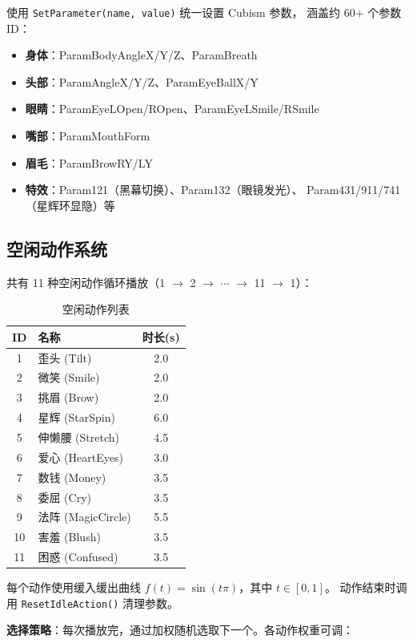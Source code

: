 \documentclass[12pt,a4paper]{ctexart}
\begin{document}
使用 \texttt{SetParameter(name, value)} 统一设置 Cubism 参数，
涵盖约 60+ 个参数 ID：
\begin{itemize}
    \item \textbf{身体}：ParamBodyAngleX/Y/Z、ParamBreath
    \item \textbf{头部}：ParamAngleX/Y/Z、ParamEyeBallX/Y
    \item \textbf{眼睛}：ParamEyeLOpen/ROpen、ParamEyeLSmile/RSmile
    \item \textbf{嘴部}：ParamMouthForm
    \item \textbf{眉毛}：ParamBrowRY/LY
    \item \textbf{特效}：Param121（黑幕切换）、Param132（眼镜发光）、
        Param431/911/741（星辉环显隐）等
\end{itemize}

\subsection{空闲动作系统}

共有 11 种空闲动作循环播放（1 $\to$ 2 $\to$ $\cdots$ $\to$ 11 $\to$ 1）：

\begin{table}[H]
\centering
\caption{空闲动作列表}
\label{tab:idle}
\begin{tabular}{clc}
\toprule
\textbf{ID} & \textbf{名称} & \textbf{时长(s)} \\
\midrule
1 & 歪头 (Tilt)    & 2.0 \\
2 & 微笑 (Smile)   & 2.0 \\
3 & 挑眉 (Brow)    & 2.0 \\
4 & 星辉 (StarSpin) & 6.0 \\
5 & 伸懒腰 (Stretch) & 4.5 \\
6 & 爱心 (HeartEyes) & 3.0 \\
7 & 数钱 (Money)   & 3.5 \\
8 & 委屈 (Cry)     & 3.5 \\
9 & 法阵 (MagicCircle) & 5.5 \\
10 & 害羞 (Blush)  & 3.5 \\
11 & 困惑 (Confused) & 3.5 \\
\bottomrule
\end{tabular}
\end{table}

每个动作使用缓入缓出曲线 $f(t)=\sin(t\pi)$，其中 $t\in[0,1]$。
动作结束时调用 \texttt{ResetIdleAction()} 清理参数。

\textbf{选择策略}：每次播放完，通过加权随机选取下一个。各动作权重可调：
\end{document}
